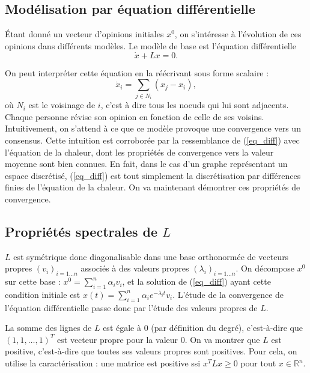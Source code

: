 \documentclass[12pt]{article}
\newcommand{\R}{\mathbb{R}}
\begin{document}
\subsection{Modélisation par équation différentielle}
Étant donné un vecteur d'opinions initiales $x^0$, on
s'intéresse à l'évolution de ces opinions dans différents
modèles. Le modèle de base est l'équation différentielle
\begin{equation}
 \label{eq_diff}
 \dot x + L x = 0.
\end{equation}

On peut interpréter cette équation en la réécrivant sous forme scalaire :
\begin{equation}
 \label{eq_diff_scal}
 \dot {x}_i = \sum_{j \in N_i} (x_j - x_i),
\end{equation}
où $N_i$ est le voisinage de $i$, c'est à dire tous les noeuds qui lui
sont adjacents. Chaque personne révise son opinion en fonction de
celle de ses voisins. Intuitivement, on s'attend à ce que ce modèle
provoque une convergence vers un consensus. Cette intuition est
corroborée par la ressemblance de (\ref{eq_diff}) avec l'équation de
la chaleur, dont les propriétés de convergence vers la valeur moyenne
sont bien connues. En fait, dans le cas d'un graphe représentant un
espace discrétisé, (\ref{eq_diff}) est tout simplement la
discrétisation par différences finies de l'équation de la chaleur. On
va maintenant démontrer ces propriétés de convergence.

\subsection{Propriétés spectrales de $L$}
\label{props_spectrales_L}
$L$ est symétrique donc diagonalisable dans une base orthonormée de
vecteurs propres $(v_i)_{i=1\dots n}$ associés à des valeurs propres
$(\lambda_i)_{i=1 \dots n}$. On décompose $x^0$ sur cette base : $x^0
= \sum_{i=1}^n \alpha_i v_i$, et la solution de (\ref{eq_diff}) ayant
cette condition initiale est $x(t) = \sum_{i=1}^n \alpha_i e^{-
 \lambda_i t} v_i$. L'étude de la convergence de l'équation
différentielle passe donc par l'étude des valeurs propres de $L$.

La somme des lignes de $L$ est égale à $0$ (par définition du degré),
c'est-à-dire que $(1, 1, \dots, 1)^T$ est vecteur propre pour la valeur
$0$. On va montrer que $L$ est positive, c'est-à-dire que toutes ses
valeurs propres sont positives. Pour cela, on utilise la
caractérisation : une matrice est positive ssi $x^T L x \geq 0$ pour
tout $x \in \R^n$.
\end{document}
